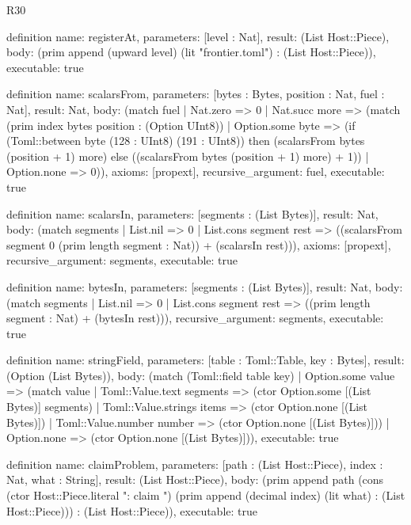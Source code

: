 \begin{lexlean}{R30}
\begin{semanticmodule}
definition{
  name: registerAt,
  parameters: [level : Nat],
  result: (List Host::Piece),
  body: (prim append (upward level) (lit "frontier.toml") : (List Host::Piece)),
  executable: true
}

definition{
  name: scalarsFrom,
  parameters: [bytes : Bytes, position : Nat, fuel : Nat],
  result: Nat,
  body: (match fuel
    | Nat.zero => 0
    | Nat.succ more => (match (prim index bytes position : (Option UInt8))
      | Option.some byte => (if (Toml::between byte (128 : UInt8) (191 : UInt8)) then (scalarsFrom bytes (position + 1) more) else ((scalarsFrom bytes (position + 1) more) + 1))
      | Option.none => 0)),
  axioms: [propext],
  recursive_argument: fuel,
  executable: true
}

definition{
  name: scalarsIn,
  parameters: [segments : (List Bytes)],
  result: Nat,
  body: (match segments
    | List.nil => 0
    | List.cons segment rest => ((scalarsFrom segment 0 (prim length segment : Nat)) + (scalarsIn rest))),
  axioms: [propext],
  recursive_argument: segments,
  executable: true
}

definition{
  name: bytesIn,
  parameters: [segments : (List Bytes)],
  result: Nat,
  body: (match segments
    | List.nil => 0
    | List.cons segment rest => ((prim length segment : Nat) + (bytesIn rest))),
  recursive_argument: segments,
  executable: true
}

definition{
  name: stringField,
  parameters: [table : Toml::Table, key : Bytes],
  result: (Option (List Bytes)),
  body: (match (Toml::field table key)
    | Option.some value => (match value
      | Toml::Value.text segments => (ctor Option.some [(List Bytes)] segments)
      | Toml::Value.strings items => (ctor Option.none [(List Bytes)])
      | Toml::Value.number number => (ctor Option.none [(List Bytes)]))
    | Option.none => (ctor Option.none [(List Bytes)])),
  executable: true
}

definition{
  name: claimProblem,
  parameters: [path : (List Host::Piece), index : Nat, what : String],
  result: (List Host::Piece),
  body: (prim append path (cons (ctor Host::Piece.literal ": claim ") (prim append (decimal index) (lit what) : (List Host::Piece))) : (List Host::Piece)),
  executable: true
}


\end{semanticmodule}
\end{lexlean}
